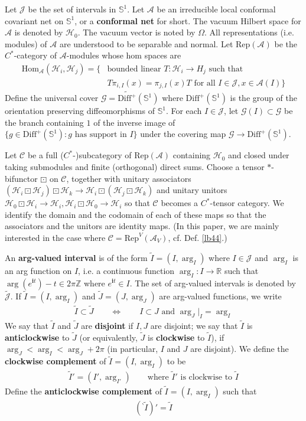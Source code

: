 \documentclass[11pt,b5paper,notitlepage]{article}
\theoremstyle{definition}
\theoremstyle{plain}
\newcommand{\mc}{\mathcal}
\newcommand{\wtd}{\widetilde}
\newcommand{\Hom}{\mathrm{Hom}}
\newcommand{\Rep}{\mathrm{Rep}}
\newcommand{\Diffp}{\mathrm{Diff}^+}
\newcommand{\Diff}{\mathrm{Diff}}
\newcommand{\scr}{\mathscr}
\newcommand{\im}{\mathbf{i}}
\newcommand{\Zbb}{\mathbb Z}
\newcommand{\Rbb}{\mathbb R}
\newcommand{\Sbb}{{\mathbb S}}
\newcommand{\bpr}{{}^\backprime}
\numberwithin{equation}{section}
\begin{document}
Let $\mc J$ be the set of intervals in $\Sbb^1$. Let $\mc A$ be an irreducible local conformal covariant net on  $\Sbb^1$, or a \textbf{conformal net} for short. The vacuum Hilbert space for $\mc A$ is denoted by $\mc H_0$. The vacuum vector is noted by $\Omega$. All representations (i.e. modules) of $\mc A$ are understood to be separable and normal. Let $\Rep(\mc A)$ be the $C^*$-category of $\mc A$-modules whose hom spaces are
\begin{align*}
\Hom_{\mc A}(\mc H_i,\mc H_j)=\{&\text{bounded linear }T:\mc H_i\rightarrow H_j \text{ such that }\\
&T\pi_{i,I}(x)=\pi_{j,I}(x)T\text{ for all } I\in\mc J,x\in\mc A(I)\}
\end{align*}
Define the universal cover $\scr G=\wtd{\Diffp}(\Sbb^1)$ where $\Diff^+(\Sbb^1)$ is the group of the orientation preserving diffeomorphisms of $\Sbb^1$.  For each $I\in\mc J$, let $\scr G(I)\subset\scr G$ be the branch containing $1$ of the inverse image of $\{g\in\Diff^+(\Sbb^1):g\text{ has support in }I\}$ under the covering map $\scr G\rightarrow\Diff^+(\Sbb^1)$.

Let $\scr C$ be a full ($C^*$-)subcategory of $\Rep(\mc A)$ containing $\mc H_0$ and closed under taking submodules and finite (orthogonal) direct sums. Choose a tensor $*$-bifunctor $\boxdot$ on $\scr C$, together with unitary associators $(\mc H_i\boxdot\mc H_j)\boxdot\mc H_k\rightarrow\mc H_i\boxdot(\mc H_j\boxdot\mc H_k)$ and unitary unitors $\mc H_0\boxdot\mc H_i\rightarrow\mc H_i,\mc H_i\boxdot\mc H_0\rightarrow\mc H_i$ so that $\scr C$ becomes a $C^*$-tensor category. We identify the domain and the codomain of each of these maps so that the associators and the unitors are identity maps. (In this paper, we are mainly interested in the case where $\scr C=\Rep^V(\mc A_V)$, cf. Def. \ref{lb44}.)



An \textbf{arg-valued interval} is of the form $\wtd I=(I,\arg_I)$ where $I\in\mc J$ and $\arg_I$ is an arg function on $I$, i.e. a continuous function $\arg_I:I\rightarrow\Rbb$ such that $\arg(e^{\im t})-t\in 2\pi\Zbb$ where $e^{\im t}\in I$. The set of arg-valued intervals is denoted by $\wtd{\mc J}$. If $\wtd I=(I,\arg_I)$ and $\wtd J=(J,\arg_J)$ are arg-valued functions, we write 
\begin{align*}
\wtd I\subset\wtd J\qquad\Leftrightarrow\qquad I\subset J\text{ and }\arg_J|_I=\arg_I
\end{align*}
We say that $\wtd I$ and $\wtd J$ are \textbf{disjoint} if $I,J$ are disjoint; we say that $\wtd I$ is \textbf{anticlockwise} to $\wtd J$ (or equivalently, $\wtd J$ is \textbf{clockwise} to $\wtd I$), if $\arg_J<\arg_I<\arg_J+2\pi$ (in particular, $I$ and $J$ are disjoint). We define the 
\textbf{clockwise complement} of $\wtd I=(I,\arg_I)$ to be
\begin{align}
\wtd I'=(I',\arg_{I'})\qquad\text{where }\wtd I'\text{ is clockwise to }\wtd I
\end{align}
Define the \textbf{anticlockwise complement} of $\wtd I=(I,\arg_I)$ such that
\begin{align}
(\bpr\wtd I)'=\wtd I
\end{align}
\end{document}
